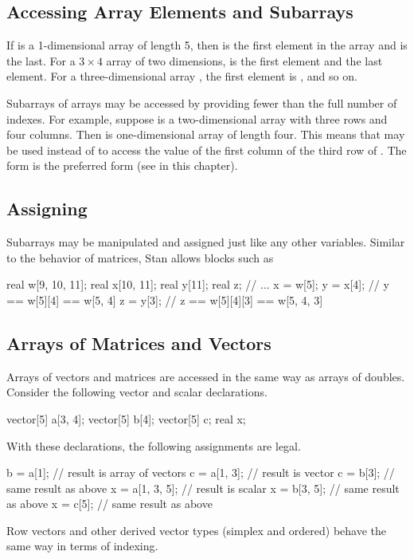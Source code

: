 \subsection{Accessing Array Elements and Subarrays}

If  is a 1-dimensional array of length 5, then  is
the first element in the array and  is the last.  For a $3
\times 4$ array  of two dimensions,  is the first
element and  the last element.  For a three-dimensional
array , the first element is , and so on.

Subarrays of arrays may be accessed by providing fewer than the full
number of indexes.  For example, suppose  is a two-dimensional
array with three rows and four columns.  Then  is
one-dimensional array of length four.  This means that 
may be used instead of  to access the value of the first
column of the third row of .  The form  is the
preferred form (see  in this chapter).

\subsection{Assigning}

Subarrays may be manipulated and assigned just like any other
variables.  Similar to the behavior of matrices, Stan allows blocks
such as
%
\begin{stancode}
real w[9, 10, 11];
real x[10, 11];
real y[11];
real z;
// ...
x = w[5];
y = x[4];  // y == w[5][4] == w[5, 4]
z = y[3];  // z == w[5][4][3] == w[5, 4, 3]
\end{stancode}
%


\subsection{Arrays of Matrices and Vectors}

Arrays of vectors and matrices are accessed in the same way as arrays
of doubles.  Consider the following vector and scalar declarations.
%
\begin{stancode}
vector[5] a[3, 4];
vector[5] b[4];
vector[5] c;
real x;
\end{stancode}
%
With these declarations, the following assignments are legal.
%
\begin{stancode}
b = a[1];      // result is array of vectors
c = a[1, 3];    // result is vector
c = b[3];      //   same result as above
x = a[1, 3, 5];  // result is scalar
x = b[3, 5];    //   same result as above
x = c[5];      //   same result as above
\end{stancode}
%
Row vectors and other derived vector types (simplex and ordered)
behave the same way in terms of indexing.

